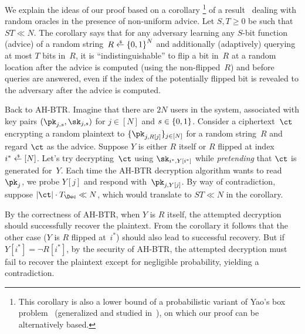 We explain the ideas of our proof based on a corollary%
\footnote{This corollary is also a lower bound of a probabilistic variant of Yao's box problem~\cite{STOC:Yao90} (generalized and studied in~\cite{EC:CorHenKog22}), on which our proof can be alternatively based.
}
of a result~\cite{C:Unruh07} dealing with random oracles in the presence of non-uniform advice.
Let ${S,T\geq 0}$ be such that ${ST\ll N}$.
The corollary says that
for any adversary learning any $S$-bit function (advice) of a random string~${R\draws\bit^N}$ and additionally (adaptively) querying at most $T$ bits in~$R$,
it is ``indistinguishable'' to flip a bit in~$R$ at a random location
after the advice is computed (using the non-flipped~$R$) and
before queries are answered,
even if the index of the potentially flipped bit is revealed to the adversary after the advice is computed.

Back to AH-BTR. Imagine that there are $2N$ users in the system, associated with key pairs $(\pk_{j,s},\sk_{j,s})$ for ${j\in[N]}$ and ${s\in{\{0,1\}}}$.
Consider a ciphertext~$\ct$ encrypting a random plaintext to $\{\pk_{j,R[j]}\}_{j\in[N]}$ for a random string~$R$ and
regard $\ct$ as the advice.
Suppose $Y$ is either $R$ itself or $R$ flipped at index ${i^\ast\draws[N]}$.
Let's try decrypting~$\ct$ using $\sk_{i^\ast,Y[i^\ast]}$
while \emph{pretending} that $\ct$ is generated for~$Y$.
Each time the AH-BTR decryption algorithm wants to read~$\pk_j$,
we probe $Y[j]$ and respond with~$\pk_{j,Y[j]}$.
By way of contradiction, suppose ${|\ct|\cdot T_\Dec\ll N}$,
which would translate to ${ST\ll N}$ in the corollary.

By the correctness of AH-BTR, when $Y$ is $R$ itself,
the attempted decryption should successfully recover the plaintext.
From the corollary it follows that the other case
($Y$ is $R$ flipped at~$i^\ast$)
should also lead to successful recovery.
But if ${Y[i^\ast]=\neg R[i^\ast]}$,
by the security of AH-BTR,
the attempted decryption must fail to recover the plaintext except for negligible probability, yielding a contradiction.
